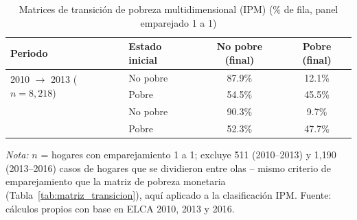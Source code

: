 \begin{table}[H]
  \centering
  \caption{Matrices de transición de pobreza multidimensional (IPM)
  (\% de fila, panel emparejado 1 a 1)}
  \label{tab:matriz_transicion_ipm}
  \begin{tabular}{llcc}
    \toprule
    \textbf{Periodo} & \textbf{Estado inicial} & \textbf{No pobre (final)} & \textbf{Pobre (final)} \\
    \midrule
    \multirow{2}{*}{2010 $\rightarrow$ 2013 ($n=8{,}218$)}
      & No pobre & 87.9\% & 12.1\% \\
      & Pobre    & 54.5\% & 45.5\% \\
    \addlinespace
    \multirow{2}{*}{2013 $\rightarrow$ 2016 ($n=6{,}911$)}
      & No pobre & 90.3\% & 9.7\% \\
      & Pobre    & 52.3\% & 47.7\% \\
    \bottomrule
  \end{tabular}
  \begin{minipage}{0.85\textwidth}
    \vspace{4pt}
    \footnotesize \textit{Nota:} $n$ = hogares con emparejamiento 1 a 1;
    excluye 511 (2010--2013) y 1{,}190 (2013--2016) casos de hogares que se
    dividieron entre olas -- mismo criterio de emparejamiento que la matriz
    de pobreza monetaria (Tabla~\ref{tab:matriz_transicion}), aquí aplicado
    a la clasificación IPM. Fuente: cálculos propios con
    base en ELCA 2010, 2013 y 2016.
  \end{minipage}
\end{table}